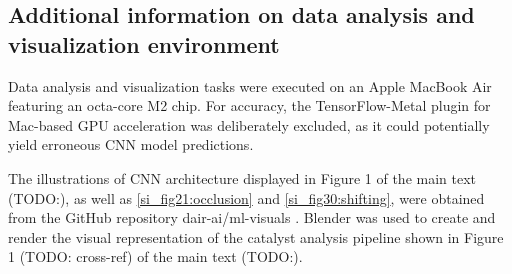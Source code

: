\subsection{Additional information on data analysis and visualization environment}
Data analysis and visualization tasks were executed on an Apple MacBook Air featuring an octa-core M2 chip.
For accuracy, the TensorFlow-Metal plugin for Mac-based GPU acceleration was deliberately excluded,
as it could potentially yield erroneous CNN model predictions.

The illustrations of CNN architecture displayed in Figure 1 of the main text (TODO:),
as well as \cref{si_fig21:occlusion} and \cref{si_fig30:shifting},
were obtained from the GitHub repository dair-ai/ml-visuals \cite{Saravia_ML_Visuals_2021}.
Blender was used to create and render the visual representation of the catalyst analysis pipeline shown in Figure 1 (TODO: cross-ref) of the main text (TODO:).

